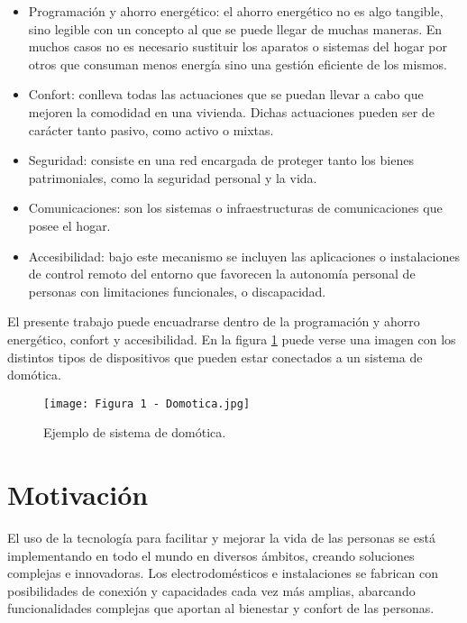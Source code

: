 \begin{itemize}
	\item Programación y ahorro energético: el ahorro energético no es algo tangible, sino legible con un concepto al que se puede llegar de muchas maneras. En muchos casos no es necesario sustituir los aparatos o sistemas del hogar por otros que consuman menos energía sino una gestión eficiente de los mismos.
	\item Confort: conlleva todas las actuaciones que se puedan llevar a cabo que mejoren la comodidad en una vivienda. Dichas actuaciones pueden ser de carácter tanto pasivo, como activo o mixtas.
	\item Seguridad: consiste en una red encargada de proteger tanto los bienes patrimoniales, como la seguridad personal y la vida.
	\item Comunicaciones: son los sistemas o infraestructuras de comunicaciones que posee el hogar.
	\item Accesibilidad: bajo este mecanismo se incluyen las aplicaciones o instalaciones de control remoto del entorno que favorecen la autonomía personal de personas con limitaciones funcionales, o discapacidad.
\end{itemize}

El presente trabajo puede encuadrarse dentro de la programación y ahorro energético, confort y accesibilidad. En la figura \ref{fig:2} puede verse una imagen con los distintos tipos de dispositivos que pueden estar conectados a un sistema de domótica.

\begin{figure}[h]
\centering
\texttt{[image: Figura 1 - Domotica.jpg]}
\caption[Ejemplo de sistema de domótica]{Ejemplo de sistema de domótica. \protect\footnotemark}
\label{fig:2}
\end{figure}

\section{Motivación}

El uso de la tecnología para facilitar y mejorar la vida de las personas se está implementando en todo el mundo en diversos ámbitos, creando soluciones complejas e innovadoras. Los electrodomésticos e instalaciones se fabrican con posibilidades de conexión y capacidades cada vez más amplias, abarcando funcionalidades complejas que aportan al bienestar y confort de las personas.


